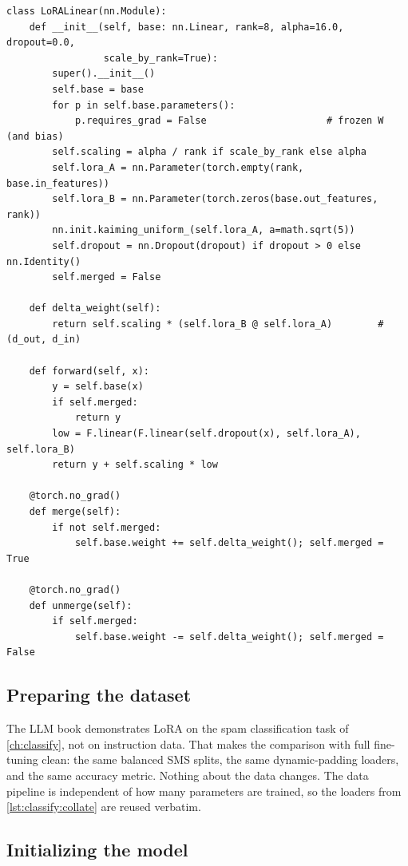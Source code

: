 \begin{lstlisting}[caption={A LoRA linear layer with merge and unmerge (from \ident{llmsys/lora.py}).},label={lst:instruct:loralinear}]
class LoRALinear(nn.Module):
    def __init__(self, base: nn.Linear, rank=8, alpha=16.0, dropout=0.0,
                 scale_by_rank=True):
        super().__init__()
        self.base = base
        for p in self.base.parameters():
            p.requires_grad = False                     # frozen W (and bias)
        self.scaling = alpha / rank if scale_by_rank else alpha
        self.lora_A = nn.Parameter(torch.empty(rank, base.in_features))
        self.lora_B = nn.Parameter(torch.zeros(base.out_features, rank))
        nn.init.kaiming_uniform_(self.lora_A, a=math.sqrt(5))
        self.dropout = nn.Dropout(dropout) if dropout > 0 else nn.Identity()
        self.merged = False

    def delta_weight(self):
        return self.scaling * (self.lora_B @ self.lora_A)        # (d_out, d_in)

    def forward(self, x):
        y = self.base(x)
        if self.merged:
            return y
        low = F.linear(F.linear(self.dropout(x), self.lora_A), self.lora_B)
        return y + self.scaling * low

    @torch.no_grad()
    def merge(self):
        if not self.merged:
            self.base.weight += self.delta_weight(); self.merged = True

    @torch.no_grad()
    def unmerge(self):
        if self.merged:
            self.base.weight -= self.delta_weight(); self.merged = False
\end{lstlisting}

\subsection{Preparing the dataset}

The LLM book demonstrates LoRA on the spam classification task of \cref{ch:classify},
not on instruction data. That makes the comparison with full fine-tuning clean: the
same balanced SMS splits, the same dynamic-padding loaders, and the same accuracy
metric. Nothing about the data changes. The data pipeline is independent of how many
parameters are trained, so the loaders from \cref{lst:classify:collate} are reused
verbatim.

\subsection{Initializing the model}

